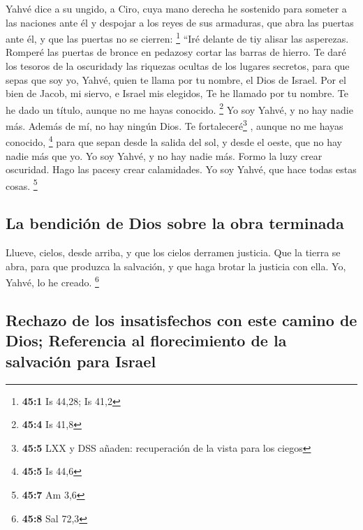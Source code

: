 \begin{paracol}{2}
 Yahvé dice a su ungido, a Ciro, cuya mano derecha he
sostenido para someter a las naciones ante él y despojar a los reyes de
sus armaduras, que abra las puertas ante él, y que las puertas no se
cierren: \footnote{\textbf{45:1} Is 44,28; Is 41,2}  ``Iré
delante de tiy alisar las asperezas. Romperé las puertas de bronce en
pedazosy cortar las barras de hierro.  Te daré los tesoros
de la oscuridady las riquezas ocultas de los lugares secretos, para que
sepas que soy yo, Yahvé, quien te llama por tu nombre, el Dios de
Israel.  Por el bien de Jacob, mi siervo, e Israel mis
elegidos, Te he llamado por tu nombre. Te he dado un título, aunque no
me hayas conocido. \footnote{\textbf{45:4} Is 41,8}  Yo
soy Yahvé, y no hay nadie más. Además de mí, no hay ningún Dios. Te
fortaleceré\footnote{\textbf{45:5} LXX y DSS añaden: recuperación de la
  vista para los ciegos} , aunque no me hayas conocido, \footnote{\textbf{45:5}
  Is 44,6}  para que sepan desde la salida del sol, y
desde el oeste, que no hay nadie más que yo. Yo soy Yahvé, y no hay
nadie más.  Formo la luzy crear oscuridad. Hago las pacesy
crear calamidades. Yo soy Yahvé, que hace todas estas cosas. \footnote{\textbf{45:7}
  Am 3,6}

\hypertarget{la-bendiciuxf3n-de-dios-sobre-la-obra-terminada}{%
\subsection{La bendición de Dios sobre la obra
terminada}\label{la-bendiciuxf3n-de-dios-sobre-la-obra-terminada}}

 Llueve, cielos, desde arriba, y que los cielos derramen
justicia. Que la tierra se abra, para que produzca la salvación, y que
haga brotar la justicia con ella. Yo, Yahvé, lo he creado. \footnote{\textbf{45:8}
  Sal 72,3}

\hypertarget{rechazo-de-los-insatisfechos-con-este-camino-de-dios-referencia-al-florecimiento-de-la-salvaciuxf3n-para-israel}{%
\subsection{Rechazo de los insatisfechos con este camino de Dios;
Referencia al florecimiento de la salvación para
Israel}\label{rechazo-de-los-insatisfechos-con-este-camino-de-dios-referencia-al-florecimiento-de-la-salvaciuxf3n-para-israel}}


\end{paracol}
